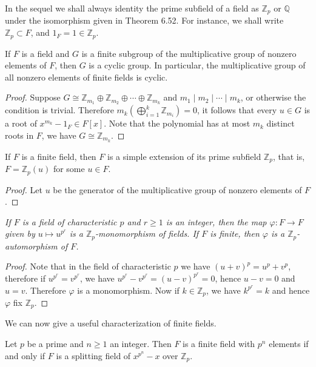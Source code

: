 In the sequel we shall always identity the prime subfield of a field as $\mathbb{Z}_p$ or $\mathbb{Q}$ under the isomorphism given in Theorem 6.52. For instance, we shall write $\mathbb{Z}_p\subset F$, and $1_F=1\in\mathbb{Z}_p$.
\begin{theorem}
If $F$ is a field and $G$ is a finite subgroup of the multiplicative group of nonzero elements of $F$, then $G$ is a cyclic group. In particular, the multiplicative group of all nonzero elements of finite fields is cyclic.
\end{theorem}
\begin{proof}
Suppose $G\cong\mathbb{Z}_{m_1}\oplus\mathbb{Z}_{m_2}\oplus\cdots\oplus\mathbb{Z}_{m_k}$ and $m_1\mid m_2\mid\cdots\mid m_k$, or otherwise the condition is trivial. Therefore $m_k\left(\bigoplus_{i=1}^k\mathbb{Z}_{m_i}\right)=0$, it follows that every $u\in G$ is a root of $x^{m_k}-1_F\in F[x]$. Note that the polynomial has at most $m_k$ distinct roots in $F$, we have $G\cong\mathbb{Z}_{m_k}$.
\end{proof}
\begin{corollary}
If $F$ is a finite field, then $F$ is a simple extension of its prime subfield $\mathbb{Z}_p$, that is, $F=\mathbb{Z}_p(u)$ for some $u\in F$.
\end{corollary}
\begin{proof}
Let $u$ be the generator of the multiplicative group of nonzero elements of $F$.
\end{proof}
\begin{lemma}\em
If $F$ is a field of characteristic $p$ and $r\ge 1$ is an integer, then the map $\varphi:F\to F$ given by $u\mapsto u^{p^r}$ is a $\mathbb{Z}_p$-monomorphism of fields. If $F$ is finite, then $\varphi$ is a $\mathbb{Z}_p$-automorphism of $F$.
\end{lemma}
\begin{proof}
Note that in the field of characteristic $p$ we have $(u+v)^p=u^p+v^p$, therefore if $u^{p^r}=v^{p^r}$, we have $u^{p^r}-v^{p^r}=(u-v)^{p^r}=0$, hence $u-v=0$ and $u=v$. Therefore $\varphi$ is a monomorphism. Now if $k\in\mathbb{Z}_p$, we have $k^{p^r}=k$ and hence $\varphi$ fix $\mathbb{Z}_p$.
\end{proof}
We can now give a useful characterization of finite fields.
\begin{proposition}
Let $p$ be a prime and $n\ge 1$ an integer. Then $F$ is a finite field with $p^n$ elements if and only if $F$ is a splitting field of $x^{p^n}-x$ over $\mathbb{Z}_p$.
\end{proposition}
